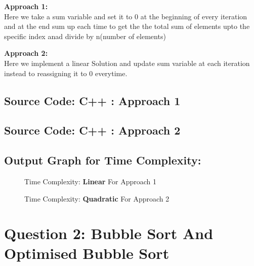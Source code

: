 \documentclass[a4paper]{article}
\begin{document}
\textbf{Approach 1:}
\\
Here we take a sum variable and set it to 0 at the beginning of every iteration and at the end sum up each time to get the the total sum of elements upto the specific index anad divide by n(number of elements)

\textbf{Approach 2:}
\\
Here we implement a linear Solution and update sum variable at each iteration instead to reassigning it to 0 everytime.

\subsection{Source Code: C++ : Approach 1}




\subsection{Source Code: C++ : Approach 2}



\clearpage %


\subsection{Output Graph for Time Complexity:}
\begin{figure}[ht]
  \centering
  \caption{Time Complexity: \textbf{Linear} For Approach 1}
  
  \label{fig:svg}
  \vspace{8pt}
  \centering
    \caption{Time Complexity: \textbf{Quadratic} For Approach 2}
  
  \label{fig:svg}
\end{figure}




\clearpage


\hspace{-2pt}
\section{\hspace{-0.5em}\textbf{ Question 2}: Bubble Sort And Optimised Bubble Sort}
\end{document}
